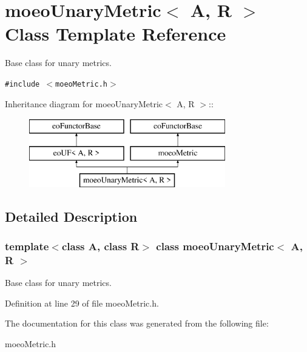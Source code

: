 \section{moeo\-Unary\-Metric$<$ A, R $>$ Class Template Reference}
\label{classmoeoUnaryMetric}
Base class for unary metrics.  


{\tt \#include $<$moeo\-Metric.h$>$}

Inheritance diagram for moeo\-Unary\-Metric$<$ A, R $>$::\begin{figure}[H]
\begin{center}
\leavevmode
\includegraphics[height=3cm]{classmoeoUnaryMetric}
\end{center}
\end{figure}


\subsection{Detailed Description}
\subsubsection*{template$<$class A, class R$>$ class moeo\-Unary\-Metric$<$ A, R $>$}

Base class for unary metrics. 



Definition at line 29 of file moeo\-Metric.h.

The documentation for this class was generated from the following file:\begin{CompactItemize}
\item 
moeo\-Metric.h\end{CompactItemize}
